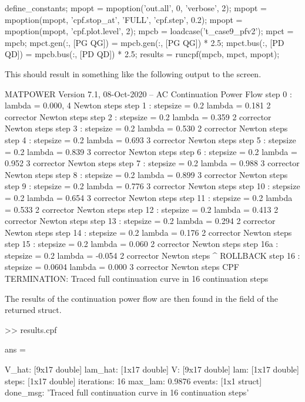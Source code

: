 \documentclass[12pt]{article}
\newcommand{\code}[1]{{\relsize{-0.5}{\tt{{#1}}}}}  %
\newcommand{\results}[0]{\code{results}}
\numberwithin{equation}{section}
\numberwithin{table}{section}
\numberwithin{figure}{section}
\begin{document}
\begin{Code}
define_constants;
mpopt = mpoption('out.all', 0, 'verbose', 2);
mpopt = mpoption(mpopt, 'cpf.stop_at', 'FULL', 'cpf.step', 0.2);
mpopt = mpoption(mpopt, 'cpf.plot.level', 2);
mpcb = loadcase('t_case9_pfv2');                    %
mpct = mpcb;                                        %
mpct.gen(:, [PG QG]) = mpcb.gen(:, [PG QG]) * 2.5;  %
mpct.bus(:, [PD QD]) = mpcb.bus(:, [PD QD]) * 2.5;  %
results = runcpf(mpcb, mpct, mpopt);
\end{Code}
This should result in something like the following output to the screen.
\begin{Code}
MATPOWER Version 7.1, 08-Oct-2020 -- AC Continuation Power Flow
step   0  :                      lambda =  0.000,  4 Newton steps
step   1  : stepsize = 0.2       lambda =  0.181   2 corrector Newton steps
step   2  : stepsize = 0.2       lambda =  0.359   2 corrector Newton steps
step   3  : stepsize = 0.2       lambda =  0.530   2 corrector Newton steps
step   4  : stepsize = 0.2       lambda =  0.693   3 corrector Newton steps
step   5  : stepsize = 0.2       lambda =  0.839   3 corrector Newton steps
step   6  : stepsize = 0.2       lambda =  0.952   3 corrector Newton steps
step   7  : stepsize = 0.2       lambda =  0.988   3 corrector Newton steps
step   8  : stepsize = 0.2       lambda =  0.899   3 corrector Newton steps
step   9  : stepsize = 0.2       lambda =  0.776   3 corrector Newton steps
step  10  : stepsize = 0.2       lambda =  0.654   3 corrector Newton steps
step  11  : stepsize = 0.2       lambda =  0.533   2 corrector Newton steps
step  12  : stepsize = 0.2       lambda =  0.413   2 corrector Newton steps
step  13  : stepsize = 0.2       lambda =  0.294   2 corrector Newton steps
step  14  : stepsize = 0.2       lambda =  0.176   2 corrector Newton steps
step  15  : stepsize = 0.2       lambda =  0.060   2 corrector Newton steps
step  16a : stepsize = 0.2       lambda = -0.054   2 corrector Newton steps ^ ROLLBACK
step  16  : stepsize = 0.0604    lambda =  0.000   3 corrector Newton steps
CPF TERMINATION: Traced full continuation curve in 16 continuation steps
\end{Code}
The results of the continuation power flow are then found in the \code{cpf} field of the returned \results{} struct.
\begin{Code}
>> results.cpf

ans = 

         V_hat: [9x17 double]
       lam_hat: [1x17 double]
             V: [9x17 double]
           lam: [1x17 double]
         steps: [1x17 double]
    iterations: 16
       max_lam: 0.9876
        events: [1x1 struct]
      done_msg: 'Traced full continuation curve in 16 continuation steps'
\end{Code}
\end{document}
